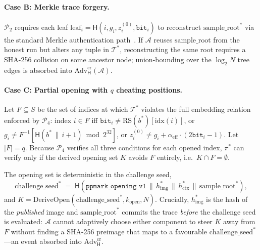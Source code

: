 \documentclass{article}
\theoremstyle{plain}
\theoremstyle{definition}
\theoremstyle{remark}
\begin{document}
\paragraph{Case B: Merkle trace forgery.} $\mathcal{P}_2$ requires each leaf $\mathrm{leaf}_i = \mathsf{H}(i, g_i, z_i^{(0)}, \mathtt{bit}_i)$ to reconstruct $\mathrm{sample\_root}^*$ via the standard Merkle authentication path~\cite{merkle87}. If $\mathcal{A}$ reuses $\mathrm{sample\_root}$ from the honest run but alters any tuple in $\mathcal{T}^*$, reconstructing the same root requires a SHA-256 collision on some ancestor node; union-bounding over the $\log_2 N$ tree edges is absorbed into $\mathrm{Adv}^{\mathrm{cr}}_{\mathsf{H}}(\mathcal{A})$.

\paragraph{Case C: Partial opening with $q$ cheating positions.} Let $F \subseteq S$ be the set of indices at which $\mathcal{T}^*$ violates the full embedding relation enforced by $\mathcal{P}_4$: index $i \in F$ iff $\mathtt{bit}_i \neq \mathrm{RS}(b^*)[\mathrm{idx}(i)]$, or $g_i \neq F^{-1}[\mathsf{H}(b^* \,\|\, i{+}1) \bmod 2^{32}]$, or $z_i^{(0)} \neq g_i + \alpha_{\mathrm{eff}} \cdot (2\mathtt{bit}_i - 1)$. Let $|F| = q$. Because $\mathcal{P}_4$ verifies all three conditions for each opened index, $\pi^*$ can verify only if the derived opening set $K$ avoids $F$ entirely, i.e.\ $K \cap F = \emptyset$.

The opening set is deterministic in the challenge seed,
\[
\mathrm{challenge\_seed}^* \;=\; \mathsf{H}\!\left(\texttt{ppmark\_opening\_v1} \,\|\, h_{\mathrm{img}}^* \,\|\, h_{\mathrm{ctx}}^* \,\|\, \mathrm{sample\_root}^*\right),
\]
and $K = \mathrm{DeriveOpen}(\mathrm{challenge\_seed}^*, k_{\mathrm{open}}, N)$. Crucially, $h_{\mathrm{img}}^*$ is the hash of the \emph{published} image and $\mathrm{sample\_root}^*$ commits the trace \emph{before} the challenge seed is evaluated: $\mathcal{A}$ cannot adaptively choose either component to steer $K$ away from $F$ without finding a SHA-256 preimage that maps to a favourable $\mathrm{challenge\_seed}^*$---an event absorbed into $\mathrm{Adv}^{\mathrm{cr}}_{\mathsf{H}}$.
\end{document}
